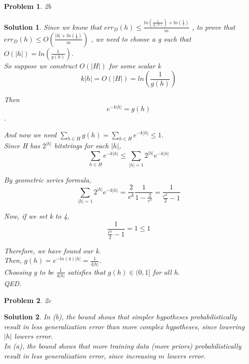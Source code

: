 \documentclass[titlepage]{article}
\newtheorem*{problem}{Problem}
\theoremstyle{solution}
\newtheorem*{solution}{Solution}
\begin{document}
        \begin{problem}
        2b
        \end{problem}

        \begin{solution}
        Since we know that 
        $err_D(h)
        \leq
        \frac{ln(\frac{1}{g(h)}) + ln(\frac{1}{\delta})}{m}$
        , to prove that
        $err_D(h) \leq O(\frac{|h|+ln(\frac{1}{\delta})}{m})$
        , we need to choose a g such that 
        $O(|h|) = ln(\frac{1}{g(h)})$. \\ 

        So suppose we construct $O(|H|)$ for some scalar k
        $$k|h| = O(|H|) = ln(\frac{1}{g(h)})$$

        Then
        $$e^{-k|h|} = g(h)$$. 

        And now we need 
        $\sum_{h \in H} g(h) = \sum_{h \in H} e^{-k|h|} \leq 1$. \\

        Since H has $2^{|h|}$ bitstrings for each $|h|$,
        $$
        \sum_{h \in H} e^{-k|h|}
        \leq
        \sum_{|h| = 1} 2^{|h|} e^{-k|h|}
        $$

        By geometric series formula,
        $$
        \sum_{|h| = 1} 2^{|h|} e^{-k|h|}
        =
        \frac{2}{e^k}\frac{1}{1 - \frac{2}{e^k}} = \frac{1}{\frac{e^k}{2}-1}
        $$

        Now, if we set k to 4,
        $$
        \frac{1}{\frac{e^k}{2}-1}
        =
        1
        \leq
        1
        $$

        Therefore, we have found our k. \\

        Then, $g(h) = e^{-ln(4)|h|} = \frac{1}{4|h|}$. \\

        Choosing g to be $\frac{1}{4|h|}$ satisfies that $g(h) \in (0,1]$ for all h. \\

        QED.

        \end{solution}

        \begin{problem}
        2c
        \end{problem}

        \begin{solution}
        In (b), the bound shows that simpler hypotheses probabilistically result in less generalization error than more complex hypotheses, since lowering $|h|$ lowers error. \\

        In (a), the bound shows that more training data (more priors) probabilistically result in less generalization error, since increasing $m$ lowers error.
        \end{solution}

         
         
\end{document}
